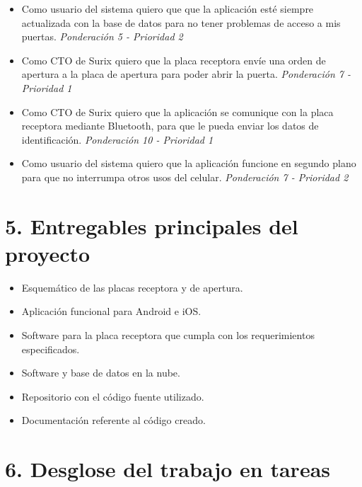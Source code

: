 \documentclass[11pt]{charter}
\begin{document}
\begin{itemize}
\item Como usuario del sistema quiero que que la aplicación esté siempre actualizada con la base de datos para no tener problemas de acceso a mis puertas.\textit{ Ponderación 5 - Prioridad 2}
\item Como CTO de Surix quiero que la placa receptora envíe una orden de apertura a la placa de apertura para poder abrir la puerta.\textit{ Ponderación 7 - Prioridad 1}
\item Como CTO de Surix quiero que la aplicación se comunique con la placa receptora mediante Bluetooth, para que le pueda enviar los datos de identificación.\textit{ Ponderación 10 - Prioridad 1}
\item Como usuario del sistema quiero que la aplicación funcione en segundo plano para que no interrumpa otros usos del celular.\textit{ Ponderación 7 - Prioridad 2}


\end{itemize}

\section{5. Entregables principales del proyecto}
\label{sec:entregables}

\begin{itemize}
\item Esquemático de las placas receptora y de apertura.
\item Aplicación funcional para Android e iOS.
\item Software para la placa receptora que cumpla con los requerimientos especificados.
\item Software y base de datos en la nube.
\item Repositorio con el código fuente utilizado.
\item Documentación referente al código creado.

\end{itemize}


\section{6. Desglose del trabajo en tareas}
\label{sec:wbs}
\end{document}
